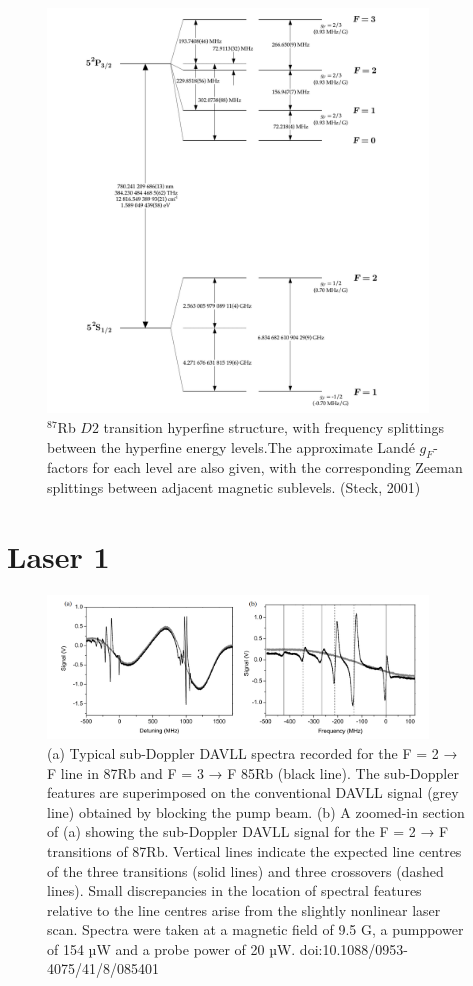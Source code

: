 \documentclass[10pt]{article}
\begin{document}
\begin{figure}[h]
    \centering
    \includegraphics[width=0.9\textwidth]{img/rb87D2.png}
    \caption{$^87$Rb $D2$ transition hyperfine structure, with frequency splittings between the hyperfine energy levels.The approximate Landé
    $g_F$-factors for each level are also given, with the corresponding Zeeman splittings between adjacent magnetic sublevels. (Steck, 2001) }
    \label{fig:image1}
\end{figure}


\section*{Laser 1}

\begin{figure}[h]
    \centering
    \includegraphics[width=0.9\textwidth]{img/brrr.PNG}
    \caption{(a) Typical sub-Doppler DAVLL spectra recorded for the F = 2 → F line in 87Rb and F = 3 → F 85Rb (black line). The
    sub-Doppler features are superimposed on the conventional DAVLL signal (grey line) obtained by blocking the pump beam. (b) A
    zoomed-in section of (a) showing the sub-Doppler DAVLL signal for the F = 2 → F transitions of 87Rb. Vertical lines indicate the
    expected line centres of the three transitions (solid lines) and three crossovers (dashed lines). Small discrepancies in the location of spectral
    features relative to the line centres arise from the slightly nonlinear laser scan. Spectra were taken at a magnetic field of 9.5 G, a pumppower of 154 µW and a probe power of 20 µW. doi:10.1088/0953-4075/41/8/085401}
    \label{fig:curvas}
\end{figure}
\end{document}
